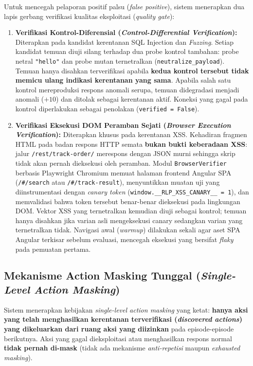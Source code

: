 Untuk mencegah pelaporan positif palsu (\textit{false positive}), sistem menerapkan dua lapis gerbang verifikasi kualitas eksploitasi (\textit{quality gate}):
\begin{enumerate}
    \item \textbf{Verifikasi Kontrol-Diferensial (\textit{Control-Differential Verification}):} Diterapkan pada kandidat kerentanan SQL Injection dan \textit{Fuzzing}. Setiap kandidat temuan diuji silang terhadap dua probe kontrol tambahan: probe netral \texttt{"hello"} dan probe mutan ternetralkan (\texttt{neutralize\_payload}). Temuan hanya disahkan terverifikasi apabila \textbf{kedua kontrol tersebut tidak memicu ulang indikasi kerentanan yang sama}. Apabila salah satu kontrol mereproduksi respons anomali serupa, temuan didegradasi menjadi anomali ($+10$) dan ditolak sebagai kerentanan aktif. Koneksi yang gagal pada kontrol diperlakukan sebagai penolakan (\texttt{verified = False}).
    \item \textbf{Verifikasi Eksekusi DOM Peramban Sejati (\textit{Browser Execution Verification}):} Diterapkan khusus pada kerentanan XSS. Kehadiran fragmen HTML pada badan respons HTTP semata \textbf{bukan bukti keberadaan XSS}: jalur \texttt{/rest/track-order/} merespons dengan JSON murni sehingga skrip tidak akan pernah dieksekusi oleh peramban. Modul \texttt{BrowserVerifier} berbasis Playwright Chromium memuat halaman frontend Angular SPA (\texttt{/\#/search} atau \texttt{/\#/track-result}), menyuntikkan muatan uji yang diinstrumentasi dengan \textit{canary token} (\texttt{window.\_\_RLP\_XSS\_CANARY\_\_ = 1}), dan memvalidasi bahwa token tersebut benar-benar dieksekusi pada lingkungan DOM. Vektor XSS yang ternetralkan kemudian diuji sebagai kontrol; temuan hanya disahkan jika varian asli mengeksekusi canary sedangkan varian yang ternetralkan tidak. Navigasi awal (\textit{warmup}) dilakukan sekali agar aset SPA Angular terkisar sebelum evaluasi, mencegah eksekusi yang bersifat \textit{flaky} pada pemuatan pertama.
\end{enumerate}

\subsection{Mekanisme Action Masking Tunggal (\textit{Single-Level Action Masking})}

Sistem menerapkan kebijakan \textit{single-level action masking} yang ketat: \textbf{hanya aksi yang telah menghasilkan kerentanan terverifikasi (\textit{discovered actions}) yang dikeluarkan dari ruang aksi yang diizinkan} pada episode-episode berikutnya. Aksi yang gagal dieksploitasi atau menghasilkan respons normal \textbf{tidak pernah di-mask} (tidak ada mekanisme \textit{anti-repetisi} maupun \textit{exhausted masking}).

